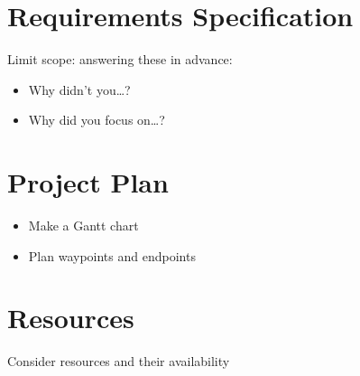 \documentclass[a4paper,11pt]{article}
\begin{document}
\section{Requirements Specification} %
Limit scope: answering these in advance:
\begin{itemize}
  \item Why didn't you\dots?
  \item Why did you focus on\dots?
\end{itemize}

\section{Project Plan} %
\begin{itemize}
  \item Make a Gantt chart
  \item Plan waypoints and endpoints
\end{itemize}

\section{Resources}
Consider resources and their availability

\newpage
\printbibliography
\end{document}
